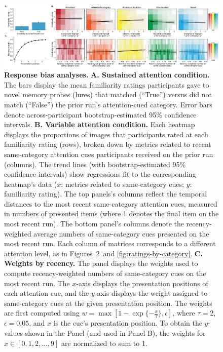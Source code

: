 \documentclass{article}
\newcommand{\familiarity}{2}
\begin{document}
\begin{figure}[tp]
  \centering
  \includegraphics[width=1\textwidth]{figs/response_bias.pdf}

\caption{\textbf{Response bias analyses.} \textbf{A. Sustained attention
condition.} The bars display the mean familiarity ratings participants gave to
novel memory probes (lures) that matched (``True'') versus did not match
(``False'') the prior run's attention-cued category. Error bars denote
across-participant bootstrap-estimated 95\% confidence intervals. \textbf{B.
Variable attention condition.} Each heatmap displays the proportions of images
that participants rated at each familiarity rating (rows), broken down by
metrics related to recent same-category attention cues participants received on
the prior run (columns). The trend lines (with bootstrap-estimated 95\%
confidence intervals) show regressions fit to the corresponding heatmap's data
($x$: metrics related to same-category cues; $y$: familiarity rating). The top
panels's columns reflect the temporal distances to the most recent
same-category attention cues, measured in numbers of presented items (where 1
denotes the final item on the most recent run). The bottom panel's columns
denote the recency-weighted average numbers of same-category cues presented on
the most recent run. Each column of matrices corresponds to a different
attention level, as in Figures~\familiarity~and \ref{fig:ratings-by-category}.
\textbf{C. Weights by recency.} The panel displays the weights used to compute
recency-weighted numbers of same-category cues on the most recent run. The
$x$-axis displays the presentation positions of each attention cue, and the
$y$-axis displays the weight assigned to same-category cues at the given
presentation position. The weights are first computed using $w = \max\left[1 -
\exp\{-\frac{x}{\tau}\} , \epsilon \right]$, where $\tau = 2$, $\epsilon =
0.05$, and $x$ is the cue's presentation position. To obtain the $y$-values
shown in the Panel (and used in Panel B), the weights for $x \in \left[0, 1, 2,
..., 9\right]$ are normalized to sum to 1.}

\label{fig:response-bias}
\end{figure}
\end{document}
